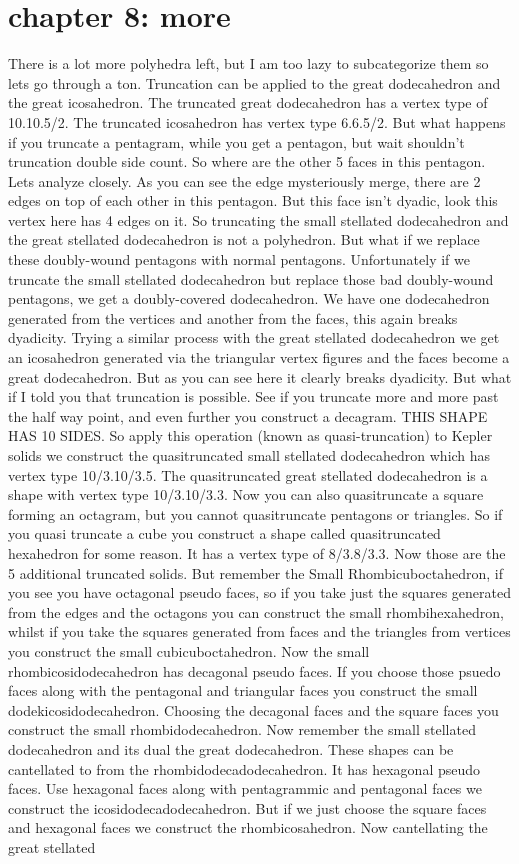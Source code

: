 \documentclass{article}
\begin{document}
\section*{chapter 8: more}
There is a lot more polyhedra left, but I am too lazy to subcategorize them so lets go through a ton. Truncation can be applied to the great dodecahedron and the great icosahedron. The truncated great dodecahedron has a vertex type of 10.10.5/2. The truncated icosahedron has vertex type 6.6.5/2. But what happens if you truncate a pentagram, while you get a pentagon, but wait shouldn't truncation double side count. So where are the other 5 faces in this pentagon. Lets analyze closely. As you can see the edge mysteriously merge, there are 2 edges on top of each other in this pentagon. But this face isn't dyadic, look this vertex here has 4 edges on it. So truncating the small stellated dodecahedron and the great stellated dodecahedron is not a polyhedron. But what if we replace these doubly-wound pentagons with normal pentagons. Unfortunately if we truncate the small stellated dodecahedron but replace those bad doubly-wound pentagons, we get a doubly-covered dodecahedron. We have one dodecahedron generated from the vertices and another from the faces, this again breaks dyadicity. Trying a similar process with the great stellated dodecahedron we get an icosahedron generated via the triangular vertex figures and the faces become a great dodecahedron. But as you can see here it clearly breaks dyadicity. But what if I told you that truncation is possible. See if you truncate more and more past the half way point, and even further you construct a decagram. THIS SHAPE HAS 10 SIDES. So apply this operation (known as quasi-truncation) to Kepler solids we construct the quasitruncated small stellated dodecahedron which has vertex type 10/3.10/3.5. The quasitruncated great stellated dodecahedron is a shape with vertex type 10/3.10/3.3. Now you can also quasitruncate a square forming an octagram, but you cannot quasitruncate pentagons or triangles. So if you quasi truncate a cube you construct a shape called quasitruncated hexahedron for some reason. It has a vertex type of 8/3.8/3.3. Now those are the 5 additional truncated solids. But remember the Small Rhombicuboctahedron, if you see you have octagonal pseudo faces, so if you take just the squares generated from the edges and the octagons you can construct the small rhombihexahedron, whilst if you take the squares generated from faces and the triangles from vertices you construct the small cubicuboctahedron. Now the small rhombicosidodecahedron has decagonal pseudo faces. If you choose those psuedo faces along with the pentagonal and triangular faces you construct the small dodekicosidodecahedron. Choosing the decagonal faces and the square faces you construct the small rhombidodecahedron. Now remember the small stellated dodecahedron and its dual the great dodecahedron. These shapes can be cantellated to from the rhombidodecadodecahedron. It has hexagonal pseudo faces. Use hexagonal faces along with pentagrammic and pentagonal faces we construct the icosidodecadodecahedron. But if we just choose the square faces and hexagonal faces we construct the rhombicosahedron.  Now cantellating the great stellated 
\end{document}
